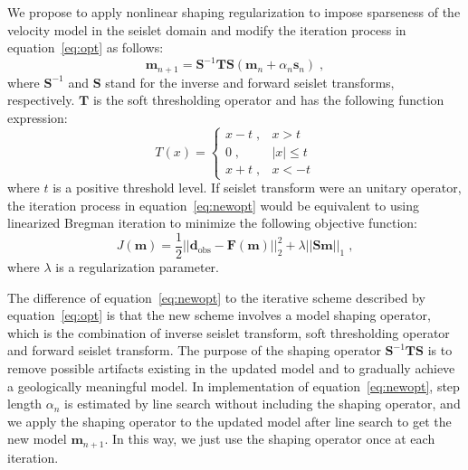 We propose to apply nonlinear shaping regularization \cite[]{fomel08} to impose sparseness of the velocity model in the seislet domain and modify the iteration process in equation~\ref{eq:opt} as follows:
\begin{equation}
\mathbf{m}_{n+1}=\mathbf{S}^{-1}\mathbf{T}\mathbf{S}(\mathbf{m}_n + \alpha_n \mathbf{s}_n) \; ,
\label{eq:newopt}
\end{equation}
where $\mathbf{S}^{-1}$ and $\mathbf{S}$ stand for the inverse and forward seislet transforms, respectively. 
$\mathbf{T}$ is the soft thresholding operator
and has the following function expression:
\begin{equation}
	T(x)= \begin{cases}
			x-t \;, & x>t \\
			0 \;, & |x| \le t \\
			x+t \;, & x<-t
		\end{cases} 
	\label{eq:softth}
\end{equation}
where $t$ is a positive threshold level.
If seislet transform were an unitary operator, the iteration process in equation~\ref{eq:newopt} would be equivalent to using linearized Bregman iteration \cite[]{yin08,cai09} to minimize the following objective function:
\begin{equation}
	J(\mathbf{m})=\frac{1}{2} ||\mathbf{d}_\text{obs}-\mathbf{F}(\mathbf{m})||_2^2 + \lambda ||\mathbf{S}\mathbf{m}||_1 \; ,
\label{eq:newobj}
\end{equation}
where $\lambda$ is a regularization parameter.

The difference of equation~\ref{eq:newopt} to the iterative scheme described by equation~\ref{eq:opt} is that the new scheme involves a model shaping operator,
which is the combination of inverse seislet transform, soft thresholding operator and forward seislet transform.
The purpose of the shaping operator $\mathbf{S}^{-1}\mathbf{T}\mathbf{S}$ is to remove possible artifacts
existing in the updated model and to gradually achieve a geologically meaningful model.
In implementation of equation~\ref{eq:newopt}, step length $\alpha_n$ is estimated by line search without including the shaping operator, and we apply the shaping operator to the updated model after line search to get the new model $\mathbf{m}_{n+1}$.
In this way, we just use the shaping operator once at each iteration.


